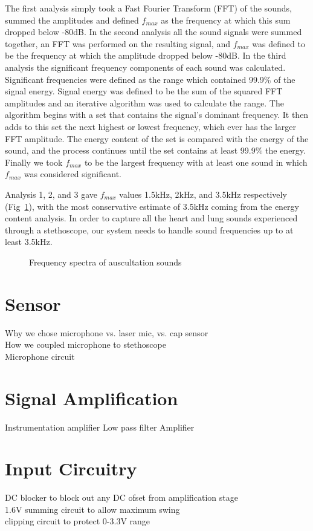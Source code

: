 The first analysis simply took a Fast Fourier Transform (FFT) of the sounds, summed the amplitudes and defined $f_{max}$ as the frequency at which this sum dropped below -80dB. In the second analysis all the sound signals were summed together, an FFT was performed on the resulting signal, and $f_{max}$ was defined to be the frequency at which the amplitude dropped below -80dB. In the third analysis the significant frequency components of each sound was calculated. Significant frequencies were defined as the range which contained 99.9\% of the signal energy. Signal energy was defined to be the sum of the squared FFT amplitudes and an iterative algorithm was used to calculate the range. The algorithm begins with a set that contains the signal's dominant frequency. It then adds to this set the next highest or lowest frequency, which ever has the larger FFT amplitude. The energy content of the set is compared with the energy of the sound, and the process continues until the set contains at least 99.9\% the energy. Finally we took $f_{max}$ to be the largest frequency with at least one sound in which $f_{max}$ was considered significant. 

Analysis 1, 2, and 3 gave $f_{max}$ values 1.5kHz, 2kHz, and 3.5kHz respectively (Fig~\ref{fig:ausc_spectra}), with the most conservative estimate of 3.5kHz coming from the energy content analysis. In order to capture all the heart and lung sounds experienced through a stethoscope, our system needs to handle sound frequencies up to at least 3.5kHz. 
\begin{figure}[htb]
	\centering
	\caption{Frequency spectra of auscultation sounds}
	\label{fig:ausc_spectra}
\end{figure}

\section{Sensor}
Why we chose microphone vs. laser mic, vs. cap sensor \\
How we coupled microphone to stethoscope \\
Microphone circuit

\section{Signal Amplification}
Instrumentation amplifier
Low pass filter
Amplifier

\section{Input Circuitry}
DC blocker to block out any DC ofset from amplification stage\\
1.6V summing circuit to allow maximum swing\\
clipping circuit to protect 0-3.3V range \\


